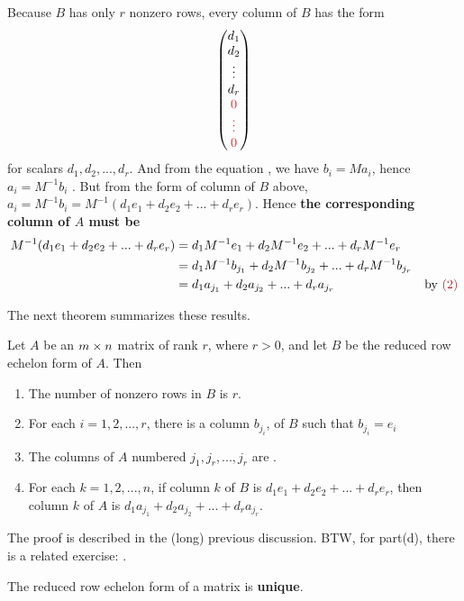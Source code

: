Because \(B\) has only \(r\) nonzero rows, every column of \(B\) has the form
\[
    \begin{pmatrix} d_1 \\ d_2 \\ \vdots \\ d_r \\ \RED{0} \\ \RED{\vdots} \\ \RED{0} \end{pmatrix}
\]
for scalars \(d_1, d_2, ..., d_r\).
And from the equation , we have \(b_i = M a_i\), hence \(a_i = M^{-1} b_i\) .
But from the form of column of \(B\) above, \(a_i = M^{-1} b_i = M^{-1} (d_1 e_1 + d_2 e_2 + ... + d_r e_r)\).
Hence \textbf{the corresponding column of \(A\) must be}
\begin{align*}
    M^{-1} (d_1 e_1 + d_2 e_2 + ... + d_r e_r)
    & = d_1 M^{-1} e_1 + d_2 M^{-1} e_2 + ... + d_r M^{-1} e_r \\
    & = d_1 M^{-1} b_{j_1} + d_2 M^{-1} b_{j_2} + ... + d_r M^{-1} b_{j_r} \\
    & = d_1 a_{j_1} + d_2 a_{j_2} + ... + d_r a_{j_r} & \text{by \MAROON{(2)}}
\end{align*}

The next theorem summarizes these results.

\begin{theorem} \label{thm 3.16}
Let \(A\) be an \(m \times n\) matrix of rank \(r\), where \(r > 0\), and let \(B\) be the reduced row echelon form of \(A\).
Then
\begin{enumerate}
\item The number of nonzero rows in \(B\) is \(r\).
\item For each \(i = 1, 2, ... , r\), there is a column \(b_{j_i}\), of \(B\) such that \(b_{j_i} = e_i\)
\item The columns of \(A\) numbered \(j_1, j_r, ..., j_r\) are \LID{}.
\item For each \(k = 1, 2, ... , n\), if column \(k\) of \(B\) is \(d_1 e_1 + d_2 e_2 + ... + d_r e_r\), then column \(k\) of \(A\) is \(d_1 a_{j_1} + d_2 a_{j_2} + ... + d_r a_{j_r}\).
\end{enumerate}

The proof is described in the (long) previous discussion.
BTW, for part(d), there is a related exercise: .
\end{theorem}

\begin{corollary} \label{corollary 3.16.1}
The reduced row echelon form of a matrix is \textbf{unique}.
\end{corollary}

